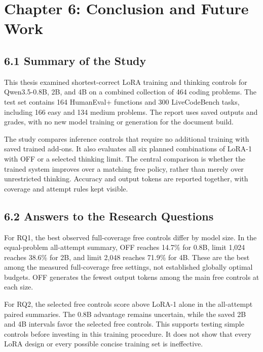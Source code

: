 \documentclass[11pt,letterpaper]{article}
\begin{document}
\section*{Chapter 6: Conclusion and Future Work}

\subsection*{6.1 Summary of the Study}

This thesis examined shortest-correct LoRA training and thinking controls for Qwen3.5-0.8B, 2B, and 4B on a combined collection of 464 coding problems. The test set contains 164 HumanEval+ functions and 300 LiveCodeBench tasks, including 166 easy and 134 medium problems. The report uses saved outputs and grades, with no new model training or generation for the document build.\par

The study compares inference controls that require no additional training with saved trained add-ons. It also evaluates all six planned combinations of LoRA-1 with OFF or a selected thinking limit. The central comparison is whether the trained system improves over a matching free policy, rather than merely over unrestricted thinking. Accuracy and output tokens are reported together, with coverage and attempt rules kept visible.\par

\subsection*{6.2 Answers to the Research Questions}

For RQ1, the best observed full-coverage free controls differ by model size. In the equal-problem all-attempt summary, OFF reaches 14.7\% for 0.8B, limit 1,024 reaches 38.6\% for 2B, and limit 2,048 reaches 71.9\% for 4B. These are the best among the measured full-coverage free settings, not established globally optimal budgets. OFF generates the fewest output tokens among the main free controls at each size.\par

For RQ2, the selected free controls score above LoRA-1 alone in the all-attempt paired summaries. The 0.8B advantage remains uncertain, while the saved 2B and 4B intervals favor the selected free controls. This supports testing simple controls before investing in this training procedure. It does not show that every LoRA design or every possible concise training set is ineffective.\par
\end{document}
